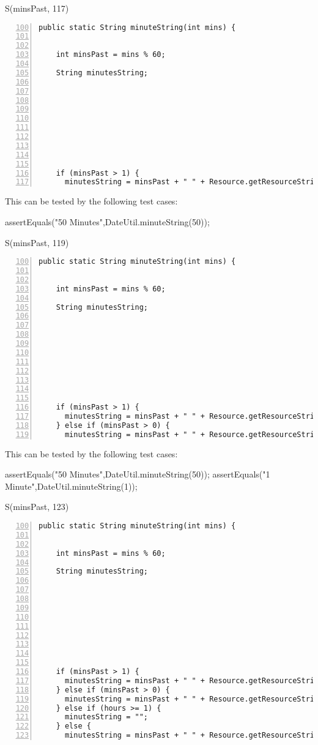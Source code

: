 \documentclass[fontsize=12pt,paper=letter,twoside]{scrartcl}
\begin{document}
S(minsPast, 117)
\begin{lstlisting}[numbers=left,firstnumber=100]
  public static String minuteString(int mins) {
    

    int minsPast = mins % 60;
    
    String minutesString;

    






    

    if (minsPast > 1) {
      minutesString = minsPast + " " + Resource.getResourceString("Minutes");
\end{lstlisting}
This can be tested by the following test cases:
\begin{code}
assertEquals("50 Minutes",DateUtil.minuteString(50));
\end{code}

S(minsPast, 119)
\begin{lstlisting}[numbers=left,firstnumber=100]
  public static String minuteString(int mins) {
    

    int minsPast = mins % 60;
    
    String minutesString;

    






    

    if (minsPast > 1) {
      minutesString = minsPast + " " + Resource.getResourceString("Minutes");
    } else if (minsPast > 0) {
      minutesString = minsPast + " " + Resource.getResourceString("Minute");
\end{lstlisting}
This can be tested by the following test cases:
\begin{code}
assertEquals("50 Minutes",DateUtil.minuteString(50));
assertEquals("1 Minute",DateUtil.minuteString(1));
\end{code}

S(minsPast, 123)
\begin{lstlisting}[numbers=left,firstnumber=100]
  public static String minuteString(int mins) {
    

    int minsPast = mins % 60;
    
    String minutesString;

    








    if (minsPast > 1) {
      minutesString = minsPast + " " + Resource.getResourceString("Minutes");
    } else if (minsPast > 0) {
      minutesString = minsPast + " " + Resource.getResourceString("Minute");
    } else if (hours >= 1) {
      minutesString = "";
    } else {
      minutesString = minsPast + " " + Resource.getResourceString("Minutes");
\end{lstlisting}
\end{document}
